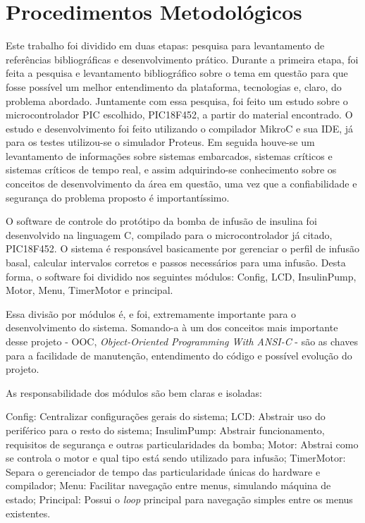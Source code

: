 \section{Procedimentos Metodológicos}
Este trabalho foi dividido em duas etapas: pesquisa para levantamento de referências bibliográficas e desenvolvimento prático. Durante a primeira etapa, foi feita a pesquisa e levantamento bibliográfico sobre o tema em questão para que fosse possível um melhor entendimento da plataforma, tecnologias e, claro, do problema abordado. Juntamente com essa pesquisa, foi feito um estudo sobre o microcontrolador PIC escolhido, PIC18F452, a partir do material encontrado. O estudo e desenvolvimento foi feito utilizando o compilador MikroC e sua IDE, já para os testes utilizou-se o simulador Proteus. Em seguida houve-se um levantamento de informações sobre sistemas embarcados, sistemas críticos e sistemas críticos de tempo real, e assim adquirindo-se conhecimento sobre os conceitos de desenvolvimento da área em questão, uma vez que a confiabilidade e segurança do problema proposto é importantíssimo.


O software de controle do protótipo da bomba de infusão de insulina foi desenvolvido na linguagem C, compilado para o microcontrolador já citado, PIC18F452. O sistema é responsável basicamente por gerenciar o perfil de infusão basal, calcular intervalos corretos e passos necessários para uma infusão. Desta forma, o
software foi dividido nos seguintes módulos: Config, LCD, InsulinPump, Motor, Menu, TimerMotor e principal. 

Essa divisão por módulos é, e foi, extremamente importante para o desenvolvimento do sistema. Somando-a à um dos conceitos mais importante desse projeto - OOC, \emph{Object-Oriented Programming With ANSI-C} - são as chaves para a facilidade de manutenção, entendimento do código e possível evolução do projeto.

As responsabilidade dos módulos são bem claras e isoladas:

Config: Centralizar configurações gerais do sistema;
LCD: Abstrair uso do periférico para o resto do sistema;
InsulimPump: Abstrair funcionamento, requisitos de segurança e outras particularidades da bomba;
Motor: Abstrai como se controla o motor e qual tipo está sendo utilizado para infusão;
TimerMotor: Separa o gerenciador de tempo das particularidade únicas do hardware e compilador;
Menu: Facilitar navegação entre menus, simulando máquina de estado;
Principal: Possui o \emph{loop} principal para navegação simples entre os menus existentes.

